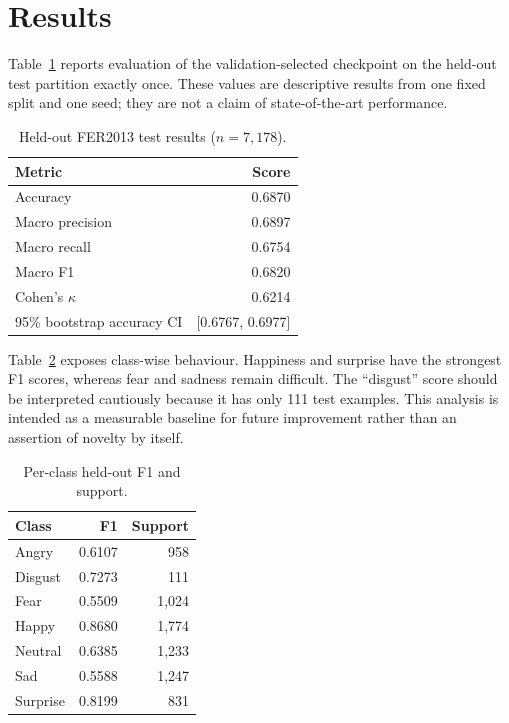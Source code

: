 \documentclass[10pt,conference]{IEEEtran}
\begin{document}
\section{Results}
Table~\ref{tab:results} reports evaluation of the validation-selected checkpoint on the held-out test partition exactly once. These values are descriptive results from one fixed split and one seed; they are not a claim of state-of-the-art performance.

\begin{table}[t]
\caption{Held-out FER2013 test results ($n=7{,}178$).}
\label{tab:results}
\centering
\begin{tabular}{lr}
\toprule
Metric & Score \\
\midrule
Accuracy & 0.6870 \\
Macro precision & 0.6897 \\
Macro recall & 0.6754 \\
Macro F1 & 0.6820 \\
Cohen's $\kappa$ & 0.6214 \\
95\% bootstrap accuracy CI & [0.6767, 0.6977] \\
\bottomrule
\end{tabular}
\end{table}

Table~\ref{tab:classwise} exposes class-wise behaviour. Happiness and surprise have the strongest F1 scores, whereas fear and sadness remain difficult. The ``disgust'' score should be interpreted cautiously because it has only 111 test examples. This analysis is intended as a measurable baseline for future improvement rather than an assertion of novelty by itself.

\begin{table}[t]
\caption{Per-class held-out F1 and support.}
\label{tab:classwise}
\centering
\begin{tabular}{lrr}
\toprule
Class & F1 & Support \\
\midrule
Angry & 0.6107 & 958 \\
Disgust & 0.7273 & 111 \\
Fear & 0.5509 & 1,024 \\
Happy & 0.8680 & 1,774 \\
Neutral & 0.6385 & 1,233 \\
Sad & 0.5588 & 1,247 \\
Surprise & 0.8199 & 831 \\
\bottomrule
\end{tabular}
\end{table}
\end{document}
